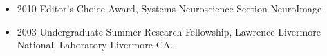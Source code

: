 \begin{itemize}
\item
  2010 Editor's Choice Award, Systems Neuroscience Section NeuroImage
\item
  2003 Undergraduate Summer Research Fellowship, Lawrence Livermore
  National, Laboratory Livermore CA.
\end{itemize}
